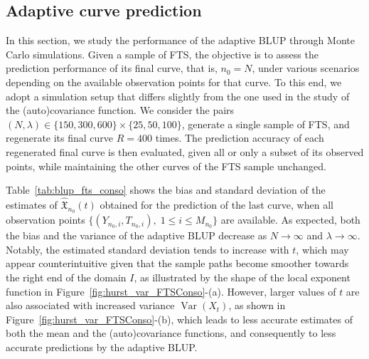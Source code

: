 \subsection{Adaptive curve prediction} 

In this section, we study the performance of the adaptive BLUP through Monte Carlo simulations. Given a sample of FTS, the objective is to assess the prediction performance of its final curve, that is, $n_0 = N$, under various scenarios depending on the available observation points for that curve. To this end, we adopt a simulation setup that differs slightly from the one used in the study of the (auto)covariance function. We consider the pairs $(N, \lambda) \in \{150, 300, 600\} \times \{25, 50, 100\}$, generate a single sample of FTS, and regenerate its final curve $R = 400$ times. The prediction accuracy of each regenerated final curve is then evaluated, given all or only a subset of its observed points, while maintaining the other curves of the FTS sample unchanged.

Table~\ref{tab:blup_fts_conso} shows the bias and standard deviation of the estimates of $\widehat{\mathfrak{X}}_{n_0}(t)$ obtained for the prediction of the last curve, when all observation points $\{(Y_{n_0, i}, T_{n_0,i}),\; 1\leq i \leq M_{n_0}\}$ are available. As expected, both the bias and the variance of the adaptive BLUP decrease as $N \to \infty$ and $\lambda \to \infty$. Notably, the estimated standard deviation tends to increase with $t$, which may appear counterintuitive given that the sample paths become smoother towards the right end of the domain $I$, as illustrated by the shape of the local exponent function in Figure~\ref{fig:hurst_var_FTSConso}-(a). However, larger values of $t$ are also associated with increased variance $\operatorname{Var}(X_t)$, as shown in Figure~\ref{fig:hurst_var_FTSConso}-(b), which leads to less accurate estimates of both the mean and the (auto)covariance functions, and consequently to less accurate predictions by the adaptive BLUP.

